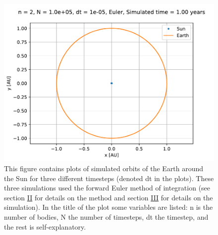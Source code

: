 \documentclass[reprint,english,notitlepage]{revtex4-1}  %
\begin{document}
\begin{figure}[H]
\includegraphics[width=\columnwidth]{../data/figures/sun-earth-3c/se_dt1e-5_fe_orbit2D.pdf}
\caption{This figure contains plots of simulated orbits of the Earth around the Sun for three different timesteps (denoted dt in the plots). These three simulations used the forward Euler method of integration (see section \hyperref[sec:II]{II} for details on the method and section \hyperref[sec:III]{III} for details on the simulation). In the title of the plot some variables are listed: n is the number of bodies, N the number of timesteps, dt the timestep, and the rest is self-explanatory.}
\label{fig:se-fe-orbits}
\end{figure}
\end{document}
